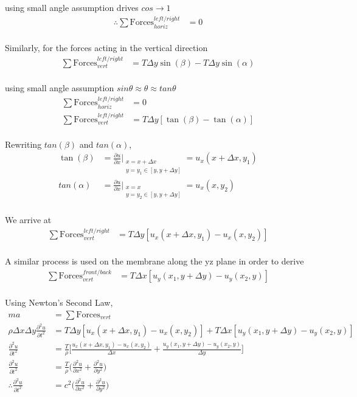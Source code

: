 \documentclass[conf]{new-aiaa}
\begin{document}
using small angle assumption drives $cos \longrightarrow 1$
\begin{align}
    \therefore \sum \text{Forces}_{horiz}^{left/right} &= 0
\end{align}
\\
Similarly, for the forces acting in the vertical direction
\begin{align}
    \sum \text{Forces}_{vert}^{left/right} &= T\Delta y \sin(\beta) - T\Delta y \sin(\alpha)
\end{align}
\\
using small angle assumption $sin \theta \approx \theta \approx tan \theta$
\begin{align}
    \sum \text{Forces}_{horiz}^{left/right} &= 0\\[8pt]
    \sum \text{Forces}_{vert}^{left/right} &= T\Delta y [\tan(\beta) - \tan(\alpha)]
\end{align}
\\
Rewriting $tan(\beta)$ and $tan(\alpha)$,
\begin{align}
    \tan(\beta) &= \frac{\partial u}{\partial x }\Bigr|_{\substack{x=x+\Delta x\\y=y_1 \in [y,y+\Delta y]}} = u_{x}(x+\Delta x, y_1)\\[10pt]
    tan(\alpha) &= \frac{\partial u}{\partial x }\Bigr|_{\substack{x=x\\y=y_2 \in [y,y+\Delta y]}} = u_{x}(x, y_2)
\end{align}
\\
We arrive at 
\begin{align}
    \sum \text{Forces}_{vert}^{left/right} &= T\Delta y[u_x (x+\Delta x,y_1) - u_x (x,y_2)]
\end{align}
\\
A similar process is used on the membrane along the yz plane in order to derive
\begin{align}
    \sum \text{Forces}_{vert}^{front/back} &= T\Delta x[u_y (x_1,y+\Delta y) - u_y(x_2,y)]
\end{align}
\\
Using Newton's Second Law,
\begin{align}
    ma &= \sum \text{Forces}_{vert}\\[8pt]
    \rho \Delta x \Delta y \frac{\partial^2 u}{\partial t^2} & = T\Delta y[u_x (x+\Delta x,y_1) - u_x (x,y_2)] + T\Delta x[u_y (x_1,y+\Delta y) - u_y(x_2,y)]\\[8pt]
    \frac{\partial^2 u}{\partial t^2} &= \frac{T}{\rho} \Bigg[\frac{u_x (x+\Delta x,y_1) - u_x (x,y_2)}{\Delta x} + \frac{u_y (x_1,y+\Delta y) - u_y(x_2,y)}{\Delta y}\Bigg]\\[8pt]
    \frac{\partial^2 u}{\partial t^2} &= \frac{T}{\rho} \Bigg(\frac{\partial^2 u}{\partial x^2}+ \frac{\partial^2 u}{\partial y^2}\Bigg)\\[8pt]
    \therefore \frac{\partial^2 u}{\partial t^2} &= c^2 \Bigg(\frac{\partial^2 u}{\partial x^2}+ \frac{\partial^2 u}{\partial y^2}\Bigg) \label{eq:final2}
\end{align}
\end{document}
